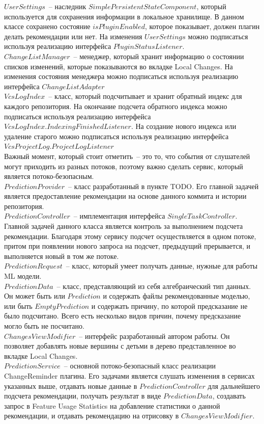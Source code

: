 $UserSettings$~-- наследник $SimplePersistentStateComponent$, который используется для сохранения информации в локальное хранилище. В данном классе сохранено состояние $isPluginEnabled$, которое показывает, должен плагин делать рекомендации или нет. На изменения $UserSettings$ можно подписаться используя реализацию интерфейса $PluginStatusListener$.\\
$ChangeListManager$~-- менеджер, который хранит информацию о состоянии списков изменений, которые показываются во вкладке Local Changes. На изменения состояния менеджера можно подписаться используя реализацию интерфейса $ChangeListAdapter$\\
$VcsLogIndex$~-- класс, который подсчитывает и хранит обратный индекс для каждого репозитория. На окончание подсчета обратного индекса можно подписаться используя реализацию интерфейса $VcsLogIndex.IndexingFinishedListener$. На создание нового индекса или удаление старого можно подписаться используя реализацию интерфейса $VcsProjectLog.ProjectLogListener$\\
Важный момент, который стоит отметить~-- это то, что события от слушателей могут приходить из разных потоков, поэтому важно сделать сервис, который является потоко-безопасным.\\
$PredictionProvider$~-- класс разработанный в пункте TODO. Его главной задачей является предоставление рекомендации на основе данного коммита и истории репозитория.\\
$PredictionController$~-- имплементация интерфейса $SingleTaskController$. Главной задачей данного класса является контроль за выполнением подсчета рекомендации. Благодаря этому сервису подсчет осуществляется в одном потоке, притом при появлении нового запроса на подсчет, предыдущий прерывается, и выполняется новый в том же потоке.\\
$PredictionRequest$~-- класс, который умеет получать данные, нужные для работы ML модели. \\
$PredictionData$~-- класс, представляющий из себя алгебраический тип данных. Он может быть или $Prediction$ и содержать файлы рекомендованные моделью, или быть $EmptyPrediction$ и содержать причину, по которой предсказание не было подсчитано.
Всего есть несколько видов причин, почему предсказание могло быть не посчитано.\\
$ChangesViewModifier$~-- интерфейс разработанный автором работы. Он позволяет добавлять новые вершины с детьми в дерево представленное во вкладке Local Changes.\\
$PredictionService$~-- основной потоко-безопасный класс реализации ChangeReminder плагина. Его задачами является слушать изменения в сервисах указанных выше, отдавать новые данные в $PredictionController$ для дальнейшего подсчета рекомендации, получать результат в виде $PredictionData$, создавать запрос в Feature Usage Statistics на добавление статистики о данной рекомендации, и отдавать рекомендацию на отрисовку в $ChangesViewModifier$.
